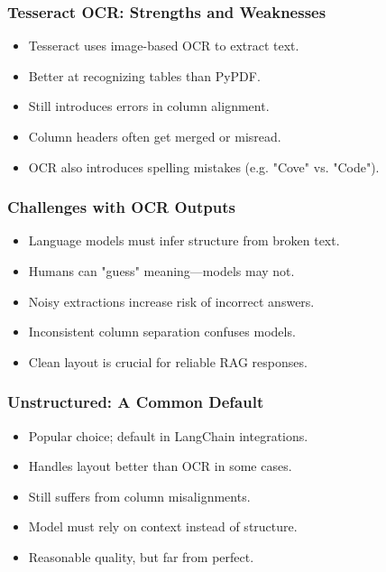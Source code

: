 \begin{frame}[fragile]\frametitle{Tesseract OCR: Strengths and Weaknesses}
  \begin{itemize}
    \item Tesseract uses image-based OCR to extract text.
    \item Better at recognizing tables than PyPDF.
    \item Still introduces errors in column alignment.
    \item Column headers often get merged or misread.
    \item OCR also introduces spelling mistakes (e.g. "Cove" vs. "Code").
  \end{itemize}
\end{frame}

\begin{frame}[fragile]\frametitle{Challenges with OCR Outputs}
  \begin{itemize}
    \item Language models must infer structure from broken text.
    \item Humans can "guess" meaning—models may not.
    \item Noisy extractions increase risk of incorrect answers.
    \item Inconsistent column separation confuses models.
    \item Clean layout is crucial for reliable RAG responses.
  \end{itemize}
\end{frame}

\begin{frame}[fragile]\frametitle{Unstructured: A Common Default}
  \begin{itemize}
    \item Popular choice; default in LangChain integrations.
    \item Handles layout better than OCR in some cases.
    \item Still suffers from column misalignments.
    \item Model must rely on context instead of structure.
    \item Reasonable quality, but far from perfect.
  \end{itemize}
\end{frame}

